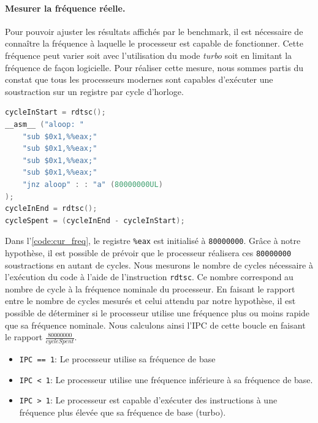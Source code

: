         \paragraph{Mesurer la fréquence réelle.} Pour pouvoir ajuster les résultats affichés par le benchmark, il est nécessaire de connaître la fréquence à laquelle le processeur est capable de fonctionner. Cette fréquence peut varier soit avec l'utilisation du mode \textit{turbo} soit en limitant la fréquence de façon logicielle. Pour réaliser cette mesure, nous sommes partis du constat que tous les processeurs modernes sont capables d'exécuter une soustraction sur un registre par cycle d'horloge. 
        
         
\begin{minipage}{0.97\linewidth}         \begin{lstlisting}[label=code:cur_freq ,language=C, caption={Code utilisé pour mesurer la fréquence réelle du processeur.}]
cycleInStart = rdtsc();
__asm__ ("aloop: "
    "sub $0x1,%%eax;"
    "sub $0x1,%%eax;"
    "sub $0x1,%%eax;"
    "sub $0x1,%%eax;"
    "jnz aloop" : : "a" (80000000UL)
);
cycleInEnd = rdtsc();
cycleSpent = (cycleInEnd - cycleInStart);
\end{lstlisting} \end{minipage}  
        
        Dans l'\autoref{code:cur_freq}, le registre \verb|%eax| est initialisé à \verb|80000000|. Grâce à notre hypothèse, il est possible de prévoir que le processeur réalisera ces \verb|80000000| soustractions en autant de cycles. Nous mesurons le nombre de cycles nécessaire à l'exécution du code à l'aide de l'instruction \verb=rdtsc=. Ce nombre correspond au nombre de cycle à la fréquence nominale du processeur. En faisant le rapport entre le nombre de cycles mesurés et celui attendu par notre hypothèse, il est possible de déterminer si le processeur utilise une fréquence plus ou moins rapide que sa fréquence nominale. Nous calculons ainsi l'\gls{IPC} de cette boucle en faisant le rapport $\frac{80000000}{cycleSpent}$.
        \begin{itemize}
            \item \verb|IPC == 1|: Le processeur utilise sa fréquence de base
            \item \verb|IPC < 1|: Le processeur utilise une fréquence inférieure à sa fréquence de base.
            \item \verb|IPC > 1|: Le processeur est capable d'exécuter des instructions à une fréquence plus élevée que sa fréquence de base (turbo).
        \end{itemize}
    
